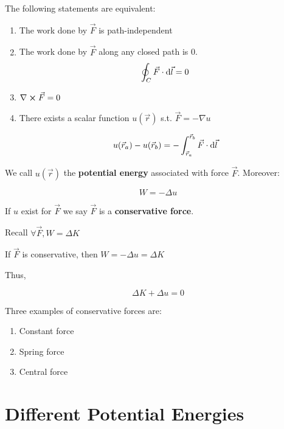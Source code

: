 \begin{theorem}
	The following statements are equivalent:
	
	\begin{enumerate}
		\item The work done by $\vec F$ is path-independent
		\item The work done by $\vec F$ along any closed path is 0.
		\begin{equation}
			\oint_C \vec F \cdot \differential \vec l = 0
		\end{equation}

		\item $\nabla \cross \vec F = 0$
		\item There exists a scalar function $u(\vec r)$ s.t. $\vec F = -\nabla u$
		
		\begin{equation}
			u(\vec r_a) - u(\vec r_b) = - \int_{\vec r_a}^{\vec r_b} \vec F \cdot \differential \vec l
		\end{equation}
	\end{enumerate}

	We call $u(\vec r)$ the \textbf{potential energy} associated with force $\vec F$. Moreover:

	\begin{equation}
		W = - \Delta u
	\end{equation}

	If $u$ exist for $\vec F$ we say $\vec F$ is a \textbf{conservative force}.
\end{theorem}

Recall $\forall \vec F, W = \Delta K$

If $\vec F$ is conservative, then $W = -\Delta u = \Delta K$

Thus,

\begin{equation}
	\Delta K + \Delta u = 0
\end{equation}

Three examples of conservative forces are:

\begin{enumerate}
	\item Constant force
	\item Spring force
	\item Central force
\end{enumerate}

\section{Different Potential Energies}

